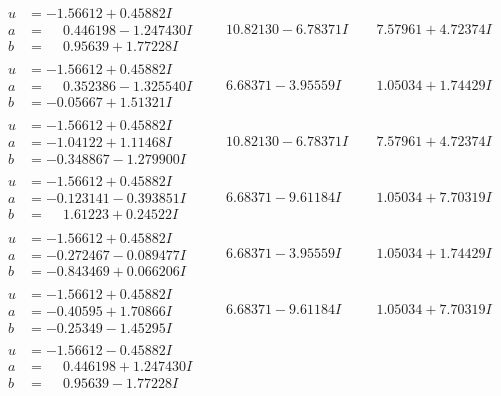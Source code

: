 \documentclass[1p]{elsarticle_modified}
\theoremstyle{definition}
\begin{document}
$$\begin{array}{c|c|c}
\begin{aligned}
u &= -1.56612 + 0.45882 I \\
a &= \phantom{-}0.446198 - 1.247430 I \\
b &= \phantom{-}0.95639 + 1.77228 I\end{aligned}
 & \phantom{-}10.82130 - 6.78371 I & \phantom{-}7.57961 + 4.72374 I \\ \hline\begin{aligned}
u &= -1.56612 + 0.45882 I \\
a &= \phantom{-}0.352386 - 1.325540 I \\
b &= -0.05667 + 1.51321 I\end{aligned}
 & \phantom{-}6.68371 - 3.95559 I & \phantom{-}1.05034 + 1.74429 I \\ \hline\begin{aligned}
u &= -1.56612 + 0.45882 I \\
a &= -1.04122 + 1.11468 I \\
b &= -0.348867 - 1.279900 I\end{aligned}
 & \phantom{-}10.82130 - 6.78371 I & \phantom{-}7.57961 + 4.72374 I \\ \hline\begin{aligned}
u &= -1.56612 + 0.45882 I \\
a &= -0.123141 - 0.393851 I \\
b &= \phantom{-}1.61223 + 0.24522 I\end{aligned}
 & \phantom{-}6.68371 - 9.61184 I & \phantom{-}1.05034 + 7.70319 I \\ \hline\begin{aligned}
u &= -1.56612 + 0.45882 I \\
a &= -0.272467 - 0.089477 I \\
b &= -0.843469 + 0.066206 I\end{aligned}
 & \phantom{-}6.68371 - 3.95559 I & \phantom{-}1.05034 + 1.74429 I \\ \hline\begin{aligned}
u &= -1.56612 + 0.45882 I \\
a &= -0.40595 + 1.70866 I \\
b &= -0.25349 - 1.45295 I\end{aligned}
 & \phantom{-}6.68371 - 9.61184 I & \phantom{-}1.05034 + 7.70319 I \\ \hline\begin{aligned}
u &= -1.56612 - 0.45882 I \\
a &= \phantom{-}0.446198 + 1.247430 I \\
b &= \phantom{-}0.95639 - 1.77228 I\end{aligned}

\end{array}$$
\end{document}
